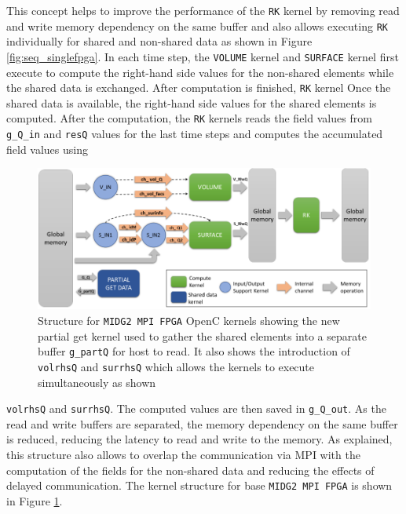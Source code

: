This concept helps to improve the performance of the \texttt{RK} kernel
by removing read and write memory dependency on the same buffer and also allows executing
\texttt{RK} individually for shared and non-shared data as shown in Figure \ref{fig:seq_singlefpga}.
In each time step, the \texttt{VOLUME} kernel and \texttt{SURFACE} kernel first execute to compute the right-hand side values for the
non-shared elements while the shared data is exchanged. After computation is finished, \texttt{RK} kernel Once the shared data is available,
the right-hand side values for the shared elements is computed. After the computation,
the \texttt{RK} kernels reads the field values from \texttt{g\_Q\_in} and \texttt{resQ} values
for the last time steps and computes the accumulated field values using
\begin{figure}[ht]%
    \centering
    \includegraphics[width=1.0\textwidth]{images/base_kernstruc}
    \caption{Structure for \texttt{MIDG2 MPI FPGA} OpenC kernels showing the new partial get kernel used to gather
     the shared elements into a separate buffer \texttt{g\_partQ} for host to read. It also shows the introduction
     of \texttt{volrhsQ} and \texttt{surrhsQ} which allows the kernels to execute simultaneously as shown}
    \label{fig:base_kernstruc}
\end{figure}
\texttt{volrhsQ} and \texttt{surrhsQ}. The computed values are then saved in \texttt{g\_Q\_out}.
As the read and write buffers are separated, the memory dependency on the same buffer is reduced,
reducing the latency to read and write to the memory. As explained, this structure also allows
to overlap the communication via MPI with the computation of the fields for the non-shared data
and reducing the effects of delayed communication. The kernel structure for base \texttt{MIDG2 MPI FPGA}
is shown in Figure \ref{fig:base_kernstruc}.
